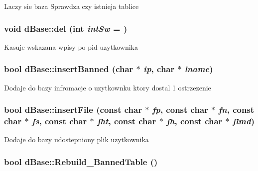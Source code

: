 Laczy sie baza Sprawdza czy istnieja tablice

\hypertarget{classdBase_ae3f64548cd601248838741b7704a0884}{
\subsubsection[{del}]{\setlength{\rightskip}{0pt plus 5cm}void dBase::del (int {\em intSw} = {})}}
\label{classdBase_ae3f64548cd601248838741b7704a0884}


Kasuje wskazana wpisy po pid uzytkownika 

\hypertarget{classdBase_a26e59ac97985d95287948445a07acd71}{
\subsubsection[{insertBanned}]{\setlength{\rightskip}{0pt plus 5cm}bool dBase::insertBanned (char $\ast$ {\em ip}, \/  char $\ast$ {\em lname})}}
\label{classdBase_a26e59ac97985d95287948445a07acd71}


Dodaje do bazy infromacje o uzytkownku ktory dostal 1 ostrzezenie 

\hypertarget{classdBase_ac5b1d43710622a869134a0f7504f6661}{
\subsubsection[{insertFile}]{\setlength{\rightskip}{0pt plus 5cm}bool dBase::insertFile (const char $\ast$ {\em fp}, \/  const char $\ast$ {\em fn}, \/  const char $\ast$ {\em fs}, \/  const char $\ast$ {\em fht}, \/  const char $\ast$ {\em fh}, \/  const char $\ast$ {\em flmd})}}
\label{classdBase_ac5b1d43710622a869134a0f7504f6661}


Dodaje do bazy udostepniony plik uzytkownika 

\hypertarget{classdBase_a05d94436a22bf5e3c52c1ab0f67c2d4c}{
\subsubsection[{Rebuild\_\-BannedTable}]{\setlength{\rightskip}{0pt plus 5cm}bool dBase::Rebuild\_\-BannedTable ()}}
\label{classdBase_a05d94436a22bf5e3c52c1ab0f67c2d4c}


